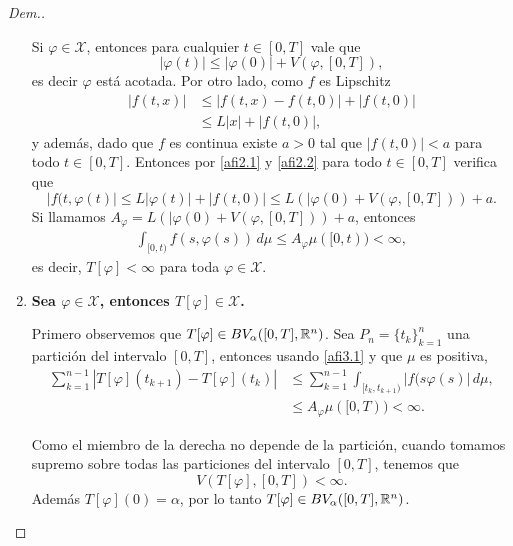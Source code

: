 \begin{proof}[Dem.]
\begin{enumerate}
Si $\varphi \in \mathcal{X}$, entonces para cualquier $t\in[0,T]$ vale que
\begin{equation}\label{afi2.1}
    |\varphi(t)|\leq |\varphi(0)|+ V(\varphi,[0,T]),
\end{equation}
es decir $\varphi$ está acotada. Por otro lado, como $f$ es Lipschitz
\begin{equation}\label{afi2.2}
\begin{split}
    |f(t,x)|&\leq |f(t,x)-f(t,0)|+ |f(t,0)|\\
    &\leq L|x|+|f(t,0)|,
\end{split}
\end{equation}
y además, dado que $f$ es continua existe $a>0$ tal que $|f(t,0)|<a$ para todo $t\in [0,T]$. Entonces por \eqref{afi2.1} y \eqref{afi2.2} para todo $t\in[0,T]$ verifica que
\begin{equation*}
    |f(t,\varphi(t)|\leq L|\varphi(t)|+|f(t,0)|\leq L\left(|\varphi(0)+V(\varphi,[0,T]) \right) +a.
\end{equation*}
Si llamamos  $A_\varphi=L\left(|\varphi(0)+V(\varphi,[0,T]) \right) +a$, entonces
\begin{equation}\label{afi3.1}
\begin{split}
    \int_{[0,t)}f(s,\varphi(s))\, d\mu\leq A_\varphi\mu([0,t))<\infty,
\end{split}
\end{equation}
es decir,  $T[\varphi]<\infty$ para toda $\varphi\in \mathcal{X}$. 

\item \textbf{Sea $\varphi\in \mathcal{X}$, entonces $T[\varphi]\in \mathcal{X}$. } 

Primero observemos que $T[\varphi]\in BV_\alpha([0,T],\mathbb{R}^n)$. Sea $P_n=\{t_k\}_{k=1}^n$ una partición del intervalo $[0,T]$, entonces usando \eqref{afi3.1} y que $\mu$ es positiva, 
\begin{equation*}
    \begin{split}
        \sum_{k=1}^{n-1}|T[\varphi](t_{k+1})-T[\varphi](t_{k})|&\leq \sum_{k=1}^{n-1}\int_{[t_k,t_{k+1})}|f(s\varphi(s)|\, d\mu, \\
        &\leq A_\varphi\mu([0,T))<\infty.
    \end{split}
\end{equation*}


Como el miembro de la derecha no depende de la partición, cuando tomamos supremo sobre todas las particiones del intervalo $[0,T]$, tenemos que
\begin{equation*}
    V(T[\varphi],[0,T])<\infty.
\end{equation*}
Además $T[\varphi](0)=\alpha$, por lo tanto $T[\varphi]\in BV_\alpha([0,T],\mathbb{R}^n)$.


\end{enumerate}
\end{proof}
